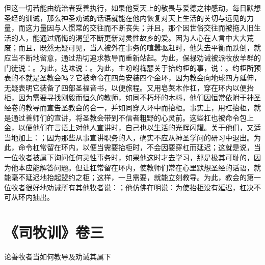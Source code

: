 但这一切若能由统治者妥善执行，如果他受天上的敬畏与爱德之神感动，每日默想圣经的训诫，那么神圣劝诫的话语就能在他内恢复对天上生活的关切与远见的力量，而这力量因与人惯常的交往而不断丧失；并且，那个因世俗交往而被拖入旧生活的人，能通过痛悔的渴望不断更新对灵性故乡的爱。因为人心在人言中大大荒废；而且，既然无疑可见，当人被外在事务的喧嚣驱赶时，他失去平衡而跌倒，就应当不断地留意，通过热切追求教导而重新站起。为此，保禄劝诫被派牧放羊群的门徒说：。为此，达味说：。为此，主吩咐梅瑟关于抬约柜的事，说：。约柜所预表的不就是圣教会吗？它被命令在四角安装四个金环，因为教会向地球四方延伸，无疑表明它装备了四部圣福音书，以便旅程。又用皂荚木作杠，穿在环内以便抬柜，因为需要寻找刚毅而恒久的教师，如同不朽坏的木料，他们因恒常依附于神圣经卷的教导而宣告圣教会的合一，并如同穿入环中而抬柜。事实上，用杠抬柜，就是通过善师们的宣讲，将圣教会带到不信者粗野的心灵前。这些杠也被命令包上金，以便他们在言语上对他人宣讲时，自己也以生活的光辉闪耀。关于他们，又适当地加上：；因为那些从事宣讲职务的人，确实不应从神圣学问的研习中退出。为此，命令杠常留在环内，以便当需要抬柜时，不会因要穿杠而延迟；这就是说，当一位牧者被属下询问任何灵性事务时，如果他这时才去学习，那是极其可耻的，因为他本应能解答问题。但让杠常留在环内，使教师们常在心里默想圣经的话语，就能毫不延迟地抬起盟约之柜；这样，一旦需要，就能立刻教导。为此，教会的第一位牧者很好地劝诫所有其他牧者说：；他仿佛在明说：为使抬柜没有延迟，杠决不可从环内抽出。\par



\section{《司牧训》卷三}

论善牧者当如何教导及劝诫其属下\par


